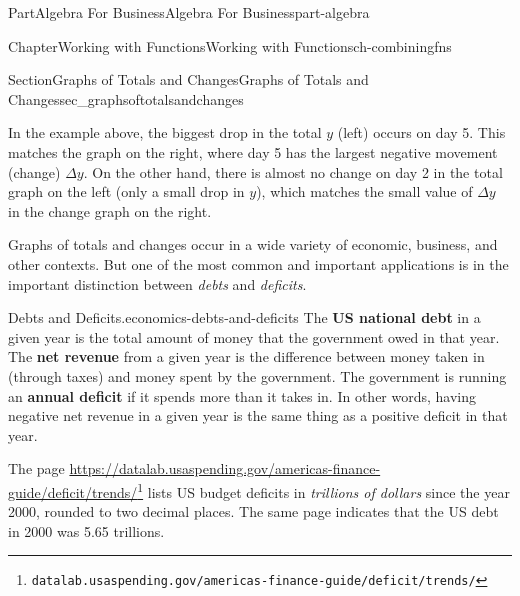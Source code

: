 \documentclass{tufte-book}
\newcommand{\terminology}[1]{\textbf{#1}}
\numberwithin{equation}{chapter}
\def \tikzhistogram (#1,#2){\draw[fill=blue,opacity=0.3] ({#1+((\xtwo-\xmin)/5)},#2) rectangle ({#1-((\xtwo-\xmin)/5)},0); \draw[draw,thick] ({#1+((\xtwo-\xmin)/5)},#2) rectangle ({#1-((\xtwo-\xmin)/5)},0); \node[draw,fill=blue, circle,inner sep=2.5pt] at (#1,#2) {};}
\begin{document}
\begin{partptx}{Part}{Algebra For Business}{}{Algebra For Business}{}{}{part-algebra}
\begin{chapterptx}{Chapter}{Working with Functions}{}{Working with Functions}{}{}{ch-combiningfns}
\begin{sectionptx}{Section}{\textasteriskcentered{}Graphs of Totals and Changes}{}{\textasteriskcentered{}Graphs of Totals and Changes}{}{}{sec_graphsoftotalsandchanges}
\begin{image}{0}{1}{0}{}
{
}%
\end{image}%
In the example above, the biggest drop in the total \(y\) (left) occurs on day 5.  This matches the graph on the right, where day 5 has the largest negative movement (change) \(\Delta y\). On the other hand, there is almost no change on day 2 in the total graph on the left (only a small drop in \(y\)), which matches the small value of \(\Delta y\) in the change graph on the right.%
\par
Graphs of totals and changes occur in a wide variety of economic, business, and other contexts. But one of the most common and important applications is in the important distinction between \emph{debts} and \emph{deficits}.%
\begin{paragraphs}{Debts and Deficits.}{economics-debts-and-deficits}%
The \terminology{US national debt} in a given year is the total amount of money that the government owed in that year. The \terminology{net revenue} from a given year is the difference between money taken in (through taxes) and money spent by the government. The government is running an \terminology{annual deficit} if it spends more than it takes in. In other words, having negative net revenue in a given year is the same thing as a positive deficit in that year.%
\par
The page \href{https://datalab.usaspending.gov/americas-finance-guide/deficit/trends/}{https:\slash{}\slash{}datalab.usaspending.gov\slash{}americas-finance-guide\slash{}deficit\slash{}trends\slash{}}\footnote{\nolinkurl{datalab.usaspending.gov/americas-finance-guide/deficit/trends/}\label{economics-debts-and-deficits-3-2}} lists US budget deficits in \emph{trillions of dollars} since the year 2000, rounded to two decimal places. The same page indicates that the US debt in 2000 was 5.65 trillions.%
\par

\end{paragraphs}
\end{sectionptx}
\end{chapterptx}
\end{partptx}
\end{document}
